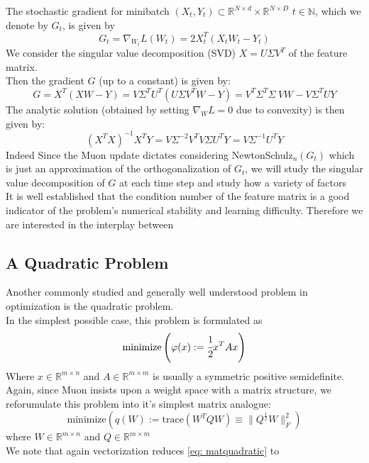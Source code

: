 \documentclass[12pt]{book}
\newcommand{\N}{\mathbb{N}}
\newcommand{\R}{\mathbb{R}}
\begin{document}
The stochastic gradient for minibatch $(X_t, Y_t)\subset \R^{N\times d} \times \R^{N\times D}$ $t\in\N$, which we denote by $G_t$, is given by 
\[
	G_t = \nabla_{W_t} L(W_t) = 2X_t^{T} (X_tW_t - Y_t)
\]
We consider the singular value decomposition (SVD) $X = U \Sigma V^{T}$ of the feature matrix. 
\\
Then the gradient $G$ (up to a constant) is given by:
 \[
G = X^{T}(XW - Y) = V\Sigma ^{T} U^{T}(U\Sigma V^{T} W - Y) = V^{T}\Sigma^{T}\Sigma \ VW - V\Sigma^{T} U Y
\]
The analytic solution (obtained by setting $\nabla_W L = 0$ due to convexity) is then given by:
\[
	(X^{T}X)^{-1}X^{T}Y = V \Sigma^{-2}V^{T} V \Sigma U^{T}Y = V \Sigma ^{-1} U^{T}Y 
\] 
Indeed 
Since the Muon update dictates considering NewtonSchulz$_n(G_t)$ which is just an approximation of the orthogonalization of $G_t$, we will study the singular value decomposition of $G$ at each time step and study how a variety of factors 
\\
It is well established that the condition number of the feature matrix is a good indicator of the problem's numerical stability and learning difficulty. Therefore we are interested in the interplay between
\subsection{A Quadratic Problem}
Another commonly studied and generally well understood problem in optimization is the quadratic problem. \\
In the simplest possible case, this problem is formulated as 
\begin{equation}\label{eq: simple quadratic}
	\text{minimize} \left( \varphi(x) := \cfrac{1}{2} x^{T} A x\right) 
\end{equation}
Where $x \in \R^{m\times n}$ and $A\in \R^{m\times m}$ is usually a symmetric positive semidefinite.
\\
Again, since Muon insists upon a weight space with a matrix structure, we reforumulate this problem into it's simplest matrix analogue:
\begin{equation}\label{eq: matquadratic}
	\text{minimize}\left( q(W) := \text{trace}(W^{T} Q W)  \equiv \|Q^{\frac{1}{2}} W\|_F^2\right)
\end{equation}
where $W\in\R^{m\times n}$ and $Q\in\R^{m\times m}$\\
We note that again vectorization reduces \eqref{eq: matquadratic} to 
\end{document}
